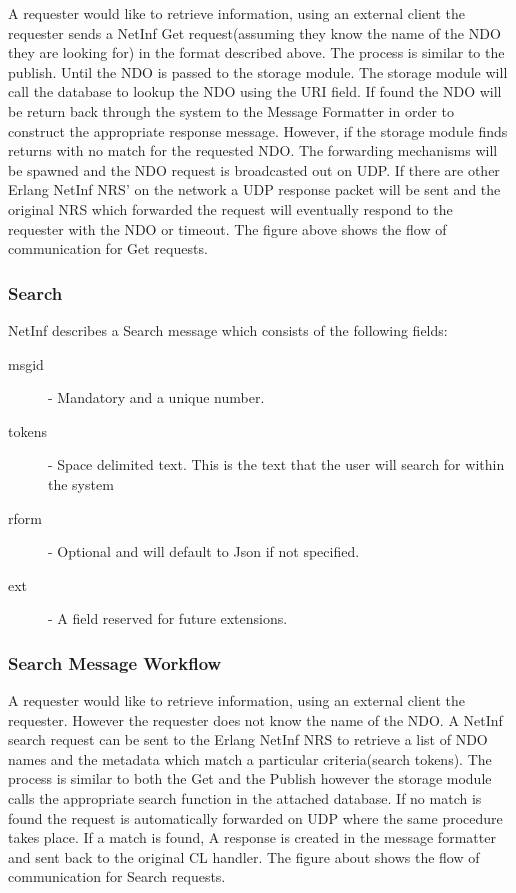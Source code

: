 A requester would like to retrieve information, using an external client the requester sends a NetInf Get request(assuming they know the name of the NDO they are looking for) in the format described above. The process is similar to the publish. Until the NDO is passed to the storage module. The storage module will call the database to lookup the NDO using the URI field. If found the NDO will be return back through the system to the Message Formatter in order to construct the appropriate response message. However, if the storage module finds returns with no match for the requested NDO. The forwarding mechanisms will be spawned and the NDO request is broadcasted out on UDP. If there are other Erlang NetInf NRS' on the network a UDP response packet will be sent and the original NRS which forwarded the request will eventually respond to the requester with the NDO or timeout. The figure above shows the flow of communication for Get requests.

\subsubsection{Search}

NetInf describes a Search message which consists of the following fields:

\begin{description}
\item[msgid] - Mandatory and a unique number.
\item[tokens] - Space delimited text. This is the text that the user will search for within the system
\item[rform] - Optional and will default to Json if not specified.
\item[ext] - A field reserved for future extensions.
\end{description}

\subsubsection{Search Message Workflow}

A requester would like to retrieve information, using an external client the requester. However the requester does not know the name of the NDO. A NetInf search request can be sent to the Erlang NetInf NRS to retrieve a list of NDO names and the metadata which match a particular criteria(search tokens). The process is similar to both the Get and the Publish however the storage module calls the appropriate search function in the attached database. If no match is found the request is automatically forwarded on UDP where the same procedure takes place. If a match is found, A response is created in the message formatter and sent back to the original CL handler. The figure about shows the flow of communication for  Search requests.